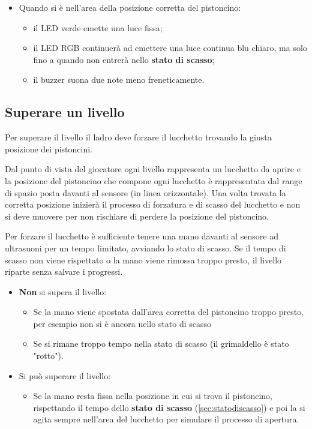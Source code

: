 \begin{itemize}
	\item Quando si è nell'area della posizione corretta del pistoncino:
	\begin{itemize}
		\item il LED verde emette una luce fissa;
		\item il LED RGB continuerà ad emettere una luce continua blu chiaro, ma solo fino a quando non entrerà nello \textbf{stato di scasso};
		\item il buzzer suona due note meno freneticamente.
	\end{itemize}
\end{itemize}

\subsection{Superare un livello}
Per superare il livello il ladro deve forzare il lucchetto trovando la giusta posizione dei pistoncini.

Dal punto di vista del giocatore ogni livello rappresenta un lucchetto da aprire e la posizione del pistoncino che compone ogni lucchetto è rappresentata dal range di spazio posta davanti al sensore (in linea orizzontale). Una volta trovata la corretta posizione inizierà il processo di forzatura e di scasso del lucchetto e non si deve muovere per non rischiare di perdere la posizione del pistoncino.

Per forzare il lucchetto è sufficiente tenere una mano davanti al sensore ad ultrasuoni per un tempo limitato, avviando lo stato di scasso. Se il tempo di scasso non viene rispettato o la mano viene rimossa troppo presto, il livello riparte senza salvare i progressi.

\begin{itemize}
	\item \textbf{Non} si supera il livello:
	\begin{itemize}
			\item Se la mano viene spostata dall'area corretta del pistoncino troppo presto, per esempio non si è ancora nello stato di scasso
			\item Se si rimane troppo tempo nella stato di scasso (il grimaldello è stato "rotto").
	\end{itemize}
\end{itemize}

\begin{itemize}
	\item Si può superare il livello:
	\begin{itemize}
			\item Se la mano resta fissa nella posizione in cui si trova il pistoncino, rispettando il tempo dello \textbf{stato di scasso} (\ref{sec:statodiscasso}) e poi la si agita sempre nell'area del lucchetto per simulare il processo di apertura.
	\end{itemize}
\end{itemize}

